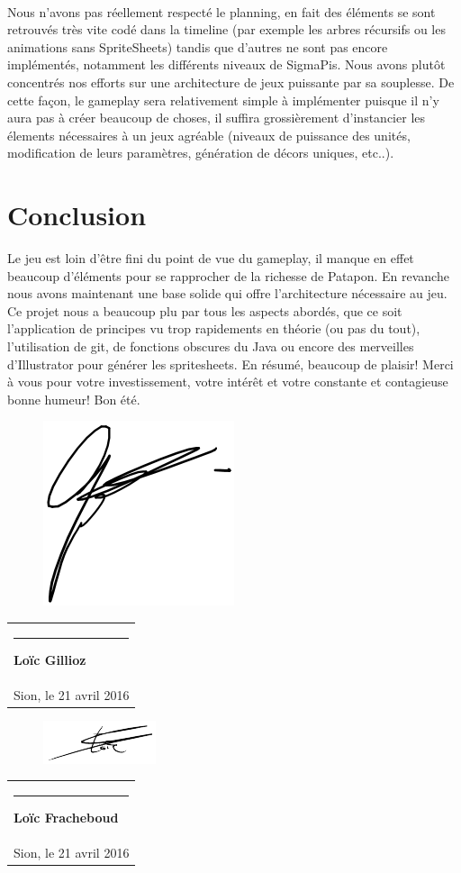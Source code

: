 \documentclass[a4paper,10pt]{article}
\newcommand{\signature}[2]{%
  \par\nobreak\bigskip
  \begin{singlespace}%
  \mbox{}\hfill\begin{tabular}{p{8cm} }
      \rule{8cm}{0.5pt}\newline{}%
        \textbf{#1}\\%
       #2 %
  \end{tabular}%
  \end{singlespace}%
  \medskip%
 }
\begin{document}
 \paragraph{}
 Nous n'avons pas réellement respecté le planning, en fait des éléments se sont retrouvés très vite codé dans la timeline (par exemple les arbres récursifs ou les animations sans SpriteSheets) tandis que d'autres ne sont pas encore implémentés, notamment les différents niveaux de SigmaPis. 
 \newline Nous avons plutôt concentrés nos efforts sur une architecture de jeux puissante par sa souplesse. De cette façon, le gameplay sera relativement simple à implémenter puisque il n'y aura pas à créer beaucoup de choses, il suffira grossièrement d'instancier les élements nécessaires à un jeux agréable (niveaux de puissance des unités, modification de leurs paramètres, génération de décors uniques, etc..).
 
 \pagebreak
 \section{Conclusion}
 Le jeu est loin d'être fini du point de vue du gameplay, il manque en effet beaucoup d'éléments pour se rapprocher de la richesse de Patapon. En revanche nous avons maintenant une base solide qui offre l'architecture nécessaire au jeu.
 \newline Ce projet nous a beaucoup plu par tous les aspects abordés, que ce soit l'application de principes vu trop rapidements en théorie (ou pas du tout), l'utilisation de git, de fonctions obscures du Java ou encore des merveilles d'Illustrator pour générer les spritesheets.
 En résumé, beaucoup de plaisir!
 Merci à vous pour votre investissement, votre intérêt et votre constante et contagieuse bonne humeur!
 Bon été.
 
 \vspace{30pt}
 \begin{figure}
 \vspace{-52pt}
 \centering
 \includegraphics[scale=0.5]{signgillioz}
 \end{figure}
 \signature{Loïc Gillioz}{Sion, le 21 avril 2016} 
 
 \begin{figure}
 \vspace{-52pt}
 \centering
 \includegraphics[scale=1]{signfracheboud}
 \end{figure}
 \signature{Loïc Fracheboud}{Sion, le 21 avril 2016} 
 
\end{document}
